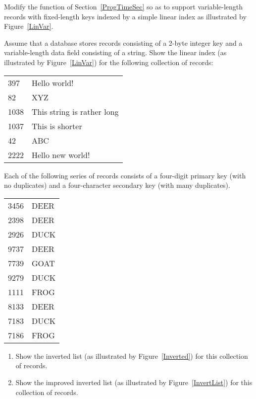 \begin{exercises}
\item
Modify the function  of Section~\ref{ProgTimeSec}
so as to support variable-length records with fixed-length
keys indexed by a simple linear index
as illustrated by Figure~\ref{LinVar}.

\item
Assume that a database stores records consisting of a 2-byte integer
key and a variable-length data field consisting of a string.
Show the linear index (as illustrated by
Figure~\ref{LinVar}) for the following collection of records:

\begin{center}
\begin{tabular}{ll}
397 &Hello world!\\
82  &XYZ\\
1038&This string is rather long\\
1037&This is shorter\\
42  &ABC\\
2222&Hello new world!\\
\end{tabular}
\end{center}

\item
Each of the following series of records consists of a four-digit
primary key (with no duplicates) and a four-character secondary key
(with many duplicates).

\begin{center}
\begin{tabular}{ll}
3456&DEER\\
2398&DEER\\
2926&DUCK\\
9737&DEER\\
7739&GOAT\\
9279&DUCK\\
1111&FROG\\
8133&DEER\\
7183&DUCK\\
7186&FROG\\
\end{tabular}
\end{center}

\begin{enumerate}
\item
Show the inverted list (as illustrated by Figure~\ref{Inverted}) for
this collection of records.

\item
Show the improved inverted list (as illustrated by
Figure~\ref{InvertList}) for this collection of records.
\end{enumerate}


\end{exercises}
